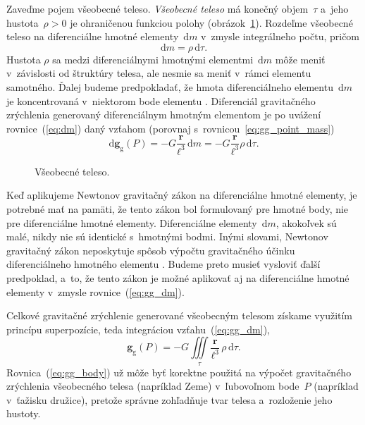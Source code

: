 \documentclass[a4paper, 12pt]{book}
\newcommand{\diff}{\mathrm d}
\newcommand{\gidx}{\mathrm g}
\let\vec\mathbf
\begin{document}
Zaveďme pojem všeobecné teleso.  \emph{Všeobecné teleso} má konečný 
objem~$\tau$ a~jeho hustota~$\rho > 0$ je ohraničenou funkciou polohy 
(obrázok~\ref{fig:gravitating_body}).  Rozdeľme všeobecné teleso na 
diferenciálne hmotné elementy~$\diff m$ v~zmysle integrálneho počtu, pričom
%
\begin{equation}
\label{eq:dm}
\diff m = \rho \, \diff \tau{.}
\end{equation}
%
Hustota $\rho$ sa medzi diferenciálnymi hmotnými elementmi~$\diff m$ môže meniť 
v~závislosti od štruktúry telesa, ale nesmie sa meniť v~rámci elementu 
samotného.  Ďalej budeme predpokladať, že hmota diferenciálneho elementu~$\diff 
m$ je koncentrovaná v~niektorom bode elementu \parencite{Kellogg1967}.  
Diferenciál gravitačného zrýchlenia generovaný diferenciálnym hmotným elementom 
je po uvážení rovnice~(\ref{eq:dm}) daný vzťahom (porovnaj 
s~rovnicou~\ref{eq:gg_point_mass})
%
\begin{equation}
\label{eq:gg_dm}
\diff \vec g_\gidx(P) = -G \frac{\vec r}{\ell^3} \, \diff m = -G \frac{\vec 
r}{\ell^3} \rho \, \diff\tau{.}
\end{equation}

\begin{figure}
\centering

\caption{Všeobecné teleso.}
\label{fig:gravitating_body}
\end{figure}

Keď aplikujeme Newtonov gravitačný zákon na diferenciálne hmotné elementy, je 
potrebné mať na pamäti, že tento zákon bol formulovaný pre hmotné body, nie pre 
diferenciálne hmotné elementy.  Diferenciálne elementy~$\diff m$, akokoľvek sú 
malé, nikdy nie sú identické s~hmotnými bodmi.  Inými slovami, Newtonov 
gravitačný zákon neposkytuje spôsob výpočtu gravitačného účinku diferenciálneho 
hmotného elementu \parencite{Kellogg1967}.  Budeme preto musieť vysloviť ďalší 
predpoklad, a~to, že tento zákon je možné aplikovať aj na diferenciálne hmotné 
elementy v~zmysle rovnice~(\ref{eq:gg_dm}).

Celkové gravitačné zrýchlenie generované všeobecným telesom získame
využitím princípu superpozície, teda integráciou vzťahu~(\ref{eq:gg_dm}),
%
\begin{equation}
\label{eq:gg_body}
\vec g_\gidx(P) = -G \iiint\limits_{\tau} \frac{\vec r}{\ell^3} \, \rho \, 
\diff\tau{.}
\end{equation}
%
Rovnica~(\ref{eq:gg_body}) už môže byť korektne použitá na výpočet gravitačného 
zrýchlenia všeobecného telesa (napríklad Zeme) v~ľubovoľnom bode~$P$ (napríklad 
v~ťažisku družice), pretože správne zohľadňuje tvar telesa a~rozloženie jeho 
hustoty.
\end{document}
